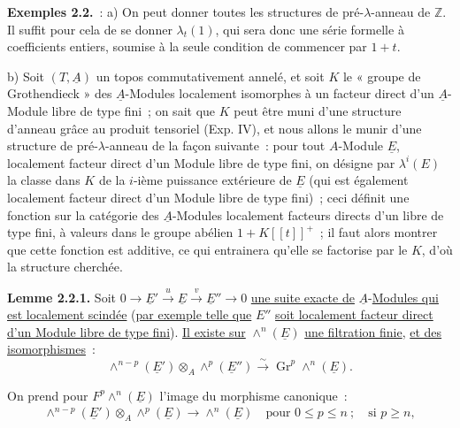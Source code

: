 
\textbf{Exemples 2.2.}~: a) On peut donner toutes les structures de pré-\(\lambda\)-anneau de \(\mathbb Z\). Il suffit pour cela de se donner \(\lambda_t(1)\), qui sera donc une série formelle à coefficients entiers, soumise à la seule condition de commencer par \(1+t\).

b) Soit \((T,\underline{A})\) un topos commutativement annelé, et soit \(K\) le « groupe de Grothendieck » des \(\underline{A}\)-Modules localement isomorphes à un facteur direct d'un \(\underline{A}\)-Module libre de type fini~; on sait que \(K\) peut être muni d'une structure d'anneau grâce au produit tensoriel (Exp. IV), et nous allons le munir d'une structure de pré-\(\lambda\)-anneau de la façon suivante~: pour tout \(A\)-Module \(\underline{E}\), localement facteur direct d'un Module libre de type fini, on désigne par \(\lambda^i(E)\) la classe dans \(K\) de la \(i\)-ième puissance extérieure de \(\underline{E}\) (qui est également localement facteur direct d'un Module libre de type fini)~; ceci définit une fonction sur la catégorie des \(\underline{A}\)-Modules localement facteurs directs d'un libre de type fini, à valeurs dans le groupe abélien \(1+K[[t]]^+\)~; il faut alors montrer que cette fonction est additive, ce qui entrainera qu'elle se factorise par le \(K\), d'où la structure cherchée.

\textbf{Lemme 2.2.1.} Soit \(0\longrightarrow \underline{E}' \xrightarrow{u} \underline{E} \xrightarrow{v} \underline{E}''\longrightarrow0\) \uline{une suite exacte de} \(\underline{A}\)-\uline{Modules qui est localement scindée} (\uline{par exemple telle que} \(E''\) \uline{soit localement facteur direct d'un Module libre de type fini}). \uline{Il existe sur} \(\wedge^n(\underline{E})\) \uline{une filtration finie}, \uline{et des isomorphismes}~:
\[
  \wedge^{n-p}(\underline{E}')\otimes_A\wedge^p(\underline{E}'')
  \xrightarrow{\sim}
  \operatorname{Gr}^p\wedge^n(\underline{E}).
\]

On prend pour \(F^p\wedge^n(\underline{E})\) l'image du morphisme canonique~:
\[
\begin{gathered}
  \wedge^{n-p}(\underline{E}')\otimes_A\wedge^p(\underline{E})\longrightarrow\wedge^n(\underline{E})
  \quad\text{pour } 0\leq p\leq n\ ;\quad \text{si } p\geq n,
\end{gathered}
\]

